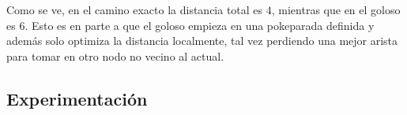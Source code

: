 Como se ve, en el camino exacto la distancia total es $4$, mientras que en el goloso es $6$. 
Esto es en parte a que el goloso empieza en una pokeparada definida y además solo optimiza la distancia localmente, tal vez perdiendo una mejor arista para tomar en otro nodo no vecino al actual.

\subsection{Experimentación}
%
%
%
%    
%


